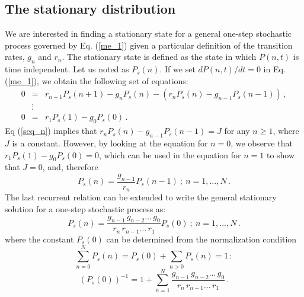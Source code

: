 \subsection{The stationary distribution}
\label{stationary_distribution}
We are interested in finding a stationary state for a general one-step stochastic process governed by Eq. (\ref{me_1}) given a particular definition of the transition rates, $g_n$ and $r_n$. The stationary state is defined as the state in which $P(n, t)$ is time independent. Let us noted as $P_s(n)$. If we set $dP(n,t)/dt=0$ in Eq. (\ref{me_1}), we obtain the following set of equations:
\begin{eqnarray}
\label{seq_n}
0 & = & r_{n+1} P_s(n+1) - g_n P_s(n) - (r_n P_s(n) - g_{n-1} P_s(n-1))\,, \\
  &\vdots& \nonumber\\
\label{seq_0}
0 & = & r_{1} P_s(1) - g_0 P_s(0)\,.
\end{eqnarray}
Eq (\ref{seq_n}) implies that $r_n P_s(n) - g_{n-1} P_s(n-1) = J$ for any $n \ge 1$, where $J$ is a constant. However, by looking at the equation for $n=0$, we observe that $r_{1} P_s(1) - g_0 P_s(0) = 0$, which can be used in the equation for $n=1$ to show that $J = 0$, and, therefore 
\begin{equation}
P_s(n) = \frac{g_{n-1}}{r_n} P_s(n-1)\ ; \ n = 1,...,N\, . 
\label{balance}
\end{equation}
The last recurrent relation can be extended to write the general stationary solution for a one-step stochastic process as: 
\begin{equation}
P_s(n) = \frac{g_{n-1}\, g_{n-2} ...\, g_0}{r_n\, r_{n-1} ...\, r_1} 
P_s(0)\ ; \ n = 1,...,N\, .
\label{P_stationary}
\end{equation}
where the constant $P_s(0)$ can be determined from the normalization condition
\begin{equation}
\sum_{n=0}^N P_s(n) = P_s(0) + \sum_{n>0} P_s(n) = 1\, :
\label{Norma}
\end{equation}
\begin{equation}
(P_s(0))^{-1} = 1 + \sum_{n=1}^{N} \frac{g_{n-1}\, g_{n-2} ...\, g_0}{r_n\, 
r_{n-1} ...\, r_1}\, .  
\label{inversionPs(0)}
\end{equation}


